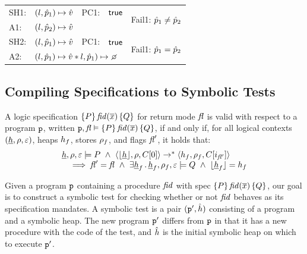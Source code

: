 \begin{tabular}{lllll}
\textsc{SH1:} & $(l, \hat{p}_1) \mapsto \hat{v}$ & \textsc{PC1: } &  ${\sf true}$ &  \multirow{2}{*}{Fail1: $\hat{p}_1 \neq \hat{p}_2$} \\
\textsc{A1:}    & \multicolumn{3}{l}{$(l, \hat{p}_2) \mapsto \hat{v}$}  &  \\[3pt]
%
\textsc{SH2:} & $(l, \hat{p}_1) \mapsto \hat{v}$ & \textsc{PC1: } &  ${\sf true}$ &  \multirow{2}{*}{Fail1: $\hat{p}_1 = \hat{p}_2$} \\
\textsc{A2:}    & \multicolumn{3}{l}{$(\loc, \sexprp_1) \mapsto \sexprv \sep \loc, \sexprp_1) \mapsto \none$}  & 

\end{tabular}




\newpage
\subsection{Compiling \jsil Specifications to Symbolic Tests}
\label{specs:to:symbolic:tests}

\begin{definition}
A \jsil logic specification $\{ P \} \, \mathit{fid}(\overline{x}) \,  \{ Q \}$ for return mode $\mathit{fl}$ is valid with respect to a program 
$\mathtt{p}$, written $\mathtt{p}, \mathit{fl} \vDash \{ P \} \, \mathit{fid}(\overline{x}) \,  \{ Q \}$,  if and only if, for all logical 
contexts $(\underline{h}, \rho, \varepsilon)$, heaps $h_f$, stores $\rho_f$, and flags $\mathit{fl}'$, it holds that: 
$$
\begin{array}{l}
    \iheap, \store, \senv \satisfies P \ \wedge \ \tuple{\deabstract{\iheap}, \store, \ctx[0]} \rightarrow^* \tuple{\heap_f, \store_f, \ctx[i_{\flag'}]} \\
       \quad \implies
            \flag' = \flag \ \wedge \ \exists \iheap_f \, . \, \iheap_f, \store_f, \senv \satisfies Q \ \wedge \ \deabstract{\iheap_f} = \heap_f
\end{array}
$$
\end{definition}

\noindent Given a \jsil program $\mathtt{p}$ containing a procedure $\mathit{fid}$ with spec {\small $\{ P \} \, \mathit{fid}(\overline{x}) \,  \{ Q \}$}, 
our goal is to construct a symbolic test for checking whether or not $\mathit{fid}$ behaves as its specification mandates.
A symbolic test is a pair $(\mathtt{p}', \hat{h})$ consisting of a \jsil program and a symbolic heap. The new program $\mathtt{p}'$ 
differs from $\mathtt{p}$ in that it has a new \jsilmain procedure with the code of the test, and $\hat{h}$ is the initial 
symbolic heap on which to execute $\mathtt{p}'$. 

